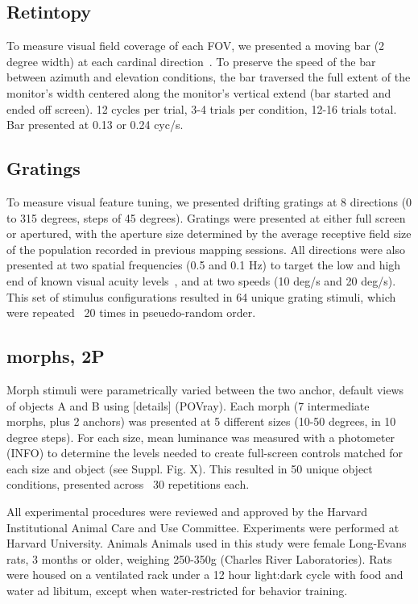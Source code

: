 \subsection{Retintopy}
To measure visual field coverage of each FOV, we presented a moving bar (2 degree width) at each cardinal direction~\cite{kalatsky2009}. To preserve the speed of the bar between azimuth and elevation conditions, the bar traversed the full extent of the monitor's width centered along the monitor's vertical extend (bar started and ended off screen). 12 cycles per trial, 3-4 trials per condition, 12-16 trials total. Bar presented at 0.13 or 0.24 cyc/s.


\subsection{Gratings}
To measure visual feature tuning, we presented drifting gratings at 8 directions (0 to 315 degrees, steps of 45 degrees). Gratings were presented at either full screen or apertured, with the aperture size determined by the average receptive field size of the population recorded in previous  mapping sessions.  All directions were also presented at two spatial frequencies (0.5 and 0.1 Hz) to target the low and high end of known visual acuity levels~\cite{stuff}, and at two speeds (10 deg/s and 20 deg/s). This set of stimulus configurations resulted in 64 unique grating stimuli, which were repeated ~20 times in pseuedo-random order.


\subsection{morphs, 2P}
Morph stimuli were parametrically varied between the two anchor, default views of objects A and B using [details] (POVray). Each morph (7 intermediate morphs, plus 2 anchors) was presented at 5 different sizes (10-50 degrees, in 10 degree steps). For each size, mean luminance was measured with a photometer (INFO) to determine the levels needed to create full-screen controls matched for each size and object (see Suppl. Fig. X). This resulted in 50 unique object conditions, presented across ~30 repetitions each.


All experimental procedures were reviewed and approved by the Harvard Institutional Animal Care and Use Committee. Experiments were performed at Harvard University. 
Animals
Animals used in this study were female Long-Evans rats, 3 months or older, weighing 250-350g (Charles River Laboratories). Rats were housed on a ventilated rack under a 12 hour light:dark cycle with food and water ad libitum, except when water-restricted for behavior training. 


